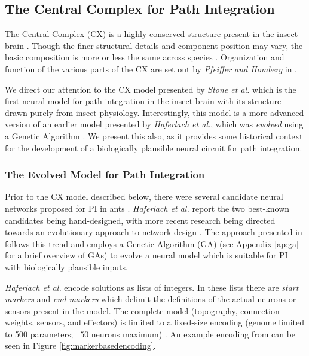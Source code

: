 \documentclass[a4paper,11pt,twoside,openright]{article}
\begin{document}
\subsection{ The Central Complex for Path Integration } \label{CXBackground}
The Central Complex (CX) is a highly conserved structure present in the insect
brain \cite{Pfeiffer2014, Stone2017}. Though the finer structural details and
component position may vary, the basic composition is more or less the same
across species \cite{Pfeiffer2014}. Organization and function of the
various parts of the CX are set out by \textit{Pfeiffer and Homberg} in
\cite{Pfeiffer2014}.
\newline
\par

We direct our attention to the CX model presented by \textit{Stone et
  al.}  which is the first neural model for path integration in the
insect brain with its structure drawn purely from insect
physiology. Interestingly, this model is a more advanced version of an
earlier model presented by \textit{Haferlach et al.}, which was
\textit{evolved} using a Genetic Algorithm \cite{Haferlach2007}. We
present this also, as it provides some historical context for the
development of a biologically plausible neural circuit for path
integration.

\subsubsection{The Evolved Model for Path Integration}
Prior to the CX model described below, there were several candidate
neural networks proposed for PI in ants
\cite{Haferlach2007}. \textit{Haferlach et al.}  report the two
best-known candidates being hand-designed, with more recent research
being directed towards an evolutionary approach to network design
\cite{Haferlach2007}. The approach presented in \cite{Haferlach2007}
follows this trend and employs a Genetic Algorithm (GA) (see Appendix
\ref{ap:ga} for a brief overview of GAs) to evolve a neural model
which is suitable for PI with biologically plausible inputs.
\newline
\par

\textit{Haferlach et al.} encode solutions as lists of integers. In these lists
there are \textit{start markers} and \textit{end markers} which delimit
the definitions of the actual neurons or sensors present in the model. The
complete model (topography, connection weights, sensors, and effectors) is
limited to a fixed-size encoding (genome limited to 500 parameters; ~$50$ neurons
maximum) \cite{Haferlach2007}. An example encoding from \cite{Haferlach2007} can
be seen in Figure \ref{fig:markerbasedencoding}.
\newline
\par
\end{document}
